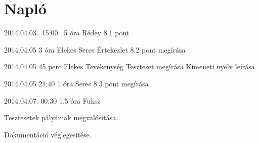 %
\section{Napló}

\begin{naplo}
\bejegyzes
{2014.04.03.~15:00~}
{5 óra}
{Rédey}
{8.1 pont}

\bejegyzes
{2014.04.05}
{3 óra}
{Elekes 
Seres
}
{Értekezlet
8.2 pont megírása
}

\bejegyzes
{2014.04.05}
{45 perc}
{Elekes}
{Tevékenység
Teszteset megírása
Kimeneti nyelv leírása
}

\bejegyzes
{2014.04.05 21:40}
{1 óra}
{Seres}
{8.3 pont megírása}

\bejegyzes
{2014.04.07. 00:30}
{1,5 óra}
{Fuksz}
{Tesztesetek pályáinak megvalósítása.

Dokumentáció véglegesítése.}

\end{naplo}

